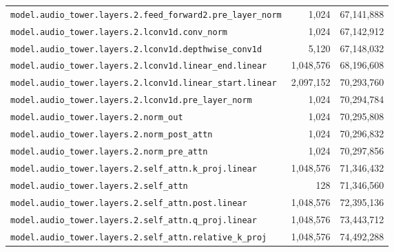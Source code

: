 \documentclass[10pt,a4paper]{article}
\theoremstyle{definition}
\begin{document}
\begin{appendices}
\begin{longtable}{p{9.5cm}rr}
\texttt{model.\allowbreak{}audio\_tower.\allowbreak{}layers.\allowbreak{}2.\allowbreak{}feed\_forward2.\allowbreak{}pre\_layer\_norm} & 1,024 & 67,141,888 \\
\texttt{model.\allowbreak{}audio\_tower.\allowbreak{}layers.\allowbreak{}2.\allowbreak{}lconv1d.\allowbreak{}conv\_norm} & 1,024 & 67,142,912 \\
\texttt{model.\allowbreak{}audio\_tower.\allowbreak{}layers.\allowbreak{}2.\allowbreak{}lconv1d.\allowbreak{}depthwise\_conv1d} & 5,120 & 67,148,032 \\
\texttt{model.\allowbreak{}audio\_tower.\allowbreak{}layers.\allowbreak{}2.\allowbreak{}lconv1d.\allowbreak{}linear\_end.\allowbreak{}linear} & 1,048,576 & 68,196,608 \\
\texttt{model.\allowbreak{}audio\_tower.\allowbreak{}layers.\allowbreak{}2.\allowbreak{}lconv1d.\allowbreak{}linear\_start.\allowbreak{}linear} & 2,097,152 & 70,293,760 \\
\texttt{model.\allowbreak{}audio\_tower.\allowbreak{}layers.\allowbreak{}2.\allowbreak{}lconv1d.\allowbreak{}pre\_layer\_norm} & 1,024 & 70,294,784 \\
\texttt{model.\allowbreak{}audio\_tower.\allowbreak{}layers.\allowbreak{}2.\allowbreak{}norm\_out} & 1,024 & 70,295,808 \\
\texttt{model.\allowbreak{}audio\_tower.\allowbreak{}layers.\allowbreak{}2.\allowbreak{}norm\_post\_attn} & 1,024 & 70,296,832 \\
\texttt{model.\allowbreak{}audio\_tower.\allowbreak{}layers.\allowbreak{}2.\allowbreak{}norm\_pre\_attn} & 1,024 & 70,297,856 \\
\texttt{model.\allowbreak{}audio\_tower.\allowbreak{}layers.\allowbreak{}2.\allowbreak{}self\_attn.\allowbreak{}k\_proj.\allowbreak{}linear} & 1,048,576 & 71,346,432 \\
\texttt{model.\allowbreak{}audio\_tower.\allowbreak{}layers.\allowbreak{}2.\allowbreak{}self\_attn} & 128 & 71,346,560 \\
\texttt{model.\allowbreak{}audio\_tower.\allowbreak{}layers.\allowbreak{}2.\allowbreak{}self\_attn.\allowbreak{}post.\allowbreak{}linear} & 1,048,576 & 72,395,136 \\
\texttt{model.\allowbreak{}audio\_tower.\allowbreak{}layers.\allowbreak{}2.\allowbreak{}self\_attn.\allowbreak{}q\_proj.\allowbreak{}linear} & 1,048,576 & 73,443,712 \\
\texttt{model.\allowbreak{}audio\_tower.\allowbreak{}layers.\allowbreak{}2.\allowbreak{}self\_attn.\allowbreak{}relative\_k\_proj} & 1,048,576 & 74,492,288 \\

\end{longtable}
\end{appendices}
\end{document}
